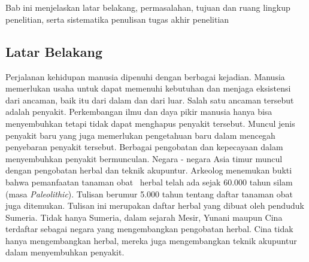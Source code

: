 
\chapter{\babSatu}
Bab ini menjelaskan latar belakang, permasalahan, tujuan dan ruang lingkup 
penelitian, serta sistematika penulisan tugas akhir penelitian 

\section{Latar Belakang}

\hspace{0.5 cm}Perjalanan kehidupan manusia dipenuhi dengan berbagai kejadian. Manusia memerlukan usaha untuk dapat memenuhi kebutuhan dan menjaga eksistensi dari ancaman, baik itu dari dalam dan dari luar. Salah satu ancaman tersebut adalah penyakit. Perkembangan ilmu dan daya pikir manusia hanya bisa menyembuhkan tetapi tidak dapat menghapus penyakit tersebut. Muncul jenis penyakit baru yang juga memerlukan pengetahuan baru dalam mencegah penyebaran penyakit tersebut. Berbagai pengobatan dan kepecayaan dalam menyembuhkan penyakit bermunculan. Negara - negara Asia timur muncul dengan pengobatan herbal dan teknik akupuntur. Arkeolog menemukan bukti bahwa pemanfaatan tanaman obat \ herbal telah ada sejak 60.000 tahun silam (masa \textit{Paleolithic}). Tulisan berumur 5.000 tahun tentang daftar tanaman obat juga ditemukan. Tulisan ini merupakan daftar herbal yang dibuat oleh penduduk Sumeria. Tidak hanya Sumeria, dalam sejarah Mesir, Yunani maupun Cina terdaftar sebagai negara yang mengembangkan pengobatan herbal. Cina tidak hanya mengembangkan herbal, mereka juga mengembangkan teknik akupuntur dalam menyembuhkan penyakit.

